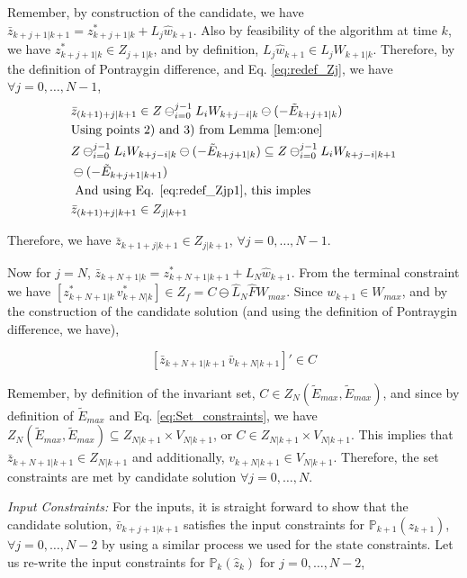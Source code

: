 Remember, by construction of the candidate, we have $\bar{z}_{k+j+1|k+1} = z^{*}_{k+j+1|k} + L_j\hat{w}_{k+1}$.
Also by feasibility of the algorithm at time $k$, we have $z^{*}_{k+j+1|k}\in Z_{j+1|k}$, and by definition, $L_j\hat{w}_{k+1} \in L_j{W}_{k+1|k}$. Therefore, by the definition of Pontraygin difference, and Eq. \ref{eq:redef_Zj}, we have $\forall j=0,\dotsc,N-1$,
\begin{subequations}
\begin{align}
&\bar{z}_{(k+1)+j|k+1} \in Z \ominus_{i=0}^{j-1}L_iW_{k+j-i|k} \ominus (-\tilde{E}_{k+j+1|k}) \\
&\text{Using points 2) and 3) from Lemma \ref{lem:one} } \nonumber \\ 
&Z \ominus_{i=0}^{j-1}L_iW_{k+j-i|k} \ominus (-\tilde{E}_{k+j+1|k}) \subseteq Z \ominus_{i=0}^{j-1}L_iW_{k+j-i|k+1}  \nonumber \\
& \ominus (-\tilde{E}_{k+j+1|k+1}) \\
&\text{ And using Eq. \ref{eq:redef_Zjp1}, this imples } \nonumber \\
&\bar{z}_{(k+1)+j|k+1} \in Z_{j|k+1}
\end{align} 
\end{subequations}

Therefore, we have $\bar{z}_{k+1+j|k+1} \in Z_{j|k+1},\,\forall j=0,\dotsc,N-1$. 

Now for $j=N$, $\bar{z}_{k+N+1|k} = z^{*}_{k+N+1|k+1} + L_N\hat{w}_{k+1}$. From the terminal constraint we have $[z^{*}_{k+N+1|k}\, v^{*}_{k+N|k}] \in Z_f = C \ominus \hat{L}_N\hat{F}W_{max}$. Since $w_{k+1} \in W_{max}$, and by the construction of the candidate solution (and using the definition of Pontraygin difference, we have), 

\begin{equation}
\label{eq:CandidateInC}
[\bar{z}_{k+N+1|k+1}\, \bar{v}_{k+N|k+1}]' \in C
\end{equation}

Remember, by definition of the invariant set, $C \in Z_N(\tilde{E}_{max},\tilde{E}_{max})$, and since by definition of $\tilde{E}_{max}$ and Eq. \ref{eq:Set_constraints}, we have $Z_N(\tilde{E}_{max},\tilde{E}_{max}) \subseteq Z_{N|k+1} \times V_{N|k+1}$, or $C \in  Z_{N|k+1} \times {V}_{N|k+1}$. This implies that $\bar{z}_{k+N+1|k+1} \in Z_{N|k+1}$ and additionally, $v_{k+N|k+1} \in {V}_{N|k+1}$.
Therefore, the set constraints are met by candidate solution $\forall j=0,\dotsc,N$. 

\textit{Input Constraints:} For the inputs, it is straight forward to show that the candidate solution, $\bar{v}_{k+j+1|k+1}$ satisfies the input constraints for $\mathbb{P}_{k+1}(\hat{z}_{k+1}) $, $\forall j=0,\dotsc,N-2$ by using a similar process we used for the state constraints. Let us re-write the input constraints for $\mathbb{P}_{k}(\hat{z}_{k})$ for $j=0,\dotsc,N-2$,

